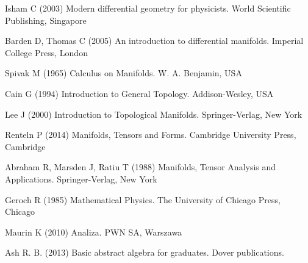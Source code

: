
%
% 
% 
%
\begin{thebibliography}{99.}
%
%
%
 Isham C (2003)
Modern differential geometry for physicists.
World Scientific Publishing, Singapore

 Barden D, Thomas C (2005)
An introduction to differential manifolds.
Imperial College Press, London

 Spivak M (1965)
Calculus on Manifolds.
W. A. Benjamin, USA

 Cain G (1994)
Introduction to General Topology.
Addison-Wesley, USA

 Lee J (2000)
Introduction to Topological Manifolds.
Springer-Verlag, New York

 Renteln P (2014)
Manifolds, Tensors and Forms.
Cambridge University Press, Cambridge

 Abraham R, Marsden J, Ratiu T (1988)
Manifolds, Tensor Analysis and Applications.
Springer-Verlag, New York

 Geroch R (1985)
Mathematical Physics.
The University of Chicago Press, Chicago

 Maurin K (2010)
Analiza.
PWN SA, Warszawa

 Ash R. B. (2013)
Basic abstract algebra for graduates.
Dover publications.

%
%

\end{thebibliography}
